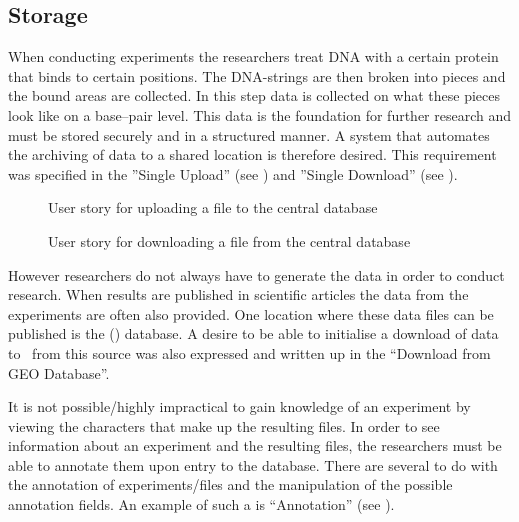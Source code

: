 \subsection{Storage}

When conducting experiments the researchers treat DNA with a certain protein that binds to certain positions. The DNA-strings are then broken into pieces and the bound areas are collected. In this step  data is collected on what these pieces look like on a base--pair level. This data is the foundation for further research and must be stored securely and in a structured manner. A system that automates the archiving of  data to a shared location is therefore desired. This requirement was specified in the  ''Single Upload'' (see ) and ''Single Download'' (see ).

\begin{figure}[h]
\caption{User story for uploading a file to the central database}
\label{fig:target_upload}
\end{figure}

\begin{figure}[h]
\caption{User story for downloading a file from the central database}
\label{fig:target_download}
\end{figure}

However researchers do not always have to generate the  data in order to conduct research. When results are published in scientific articles the  data from the experiments are often also provided. One location where these  data files can be published is the  () database. A desire to be able to initialise a download of  data to \appName\ from this source was also expressed and written up in the  ``Download from GEO Database''.

It is not possible/highly impractical to gain knowledge of an experiment by viewing the characters that make up the resulting  files. In order to see information about an experiment and the resulting files, the researchers must be able to annotate them upon entry to the database. There are several  to do with the annotation of experiments/files and the manipulation of the possible annotation fields. An example of such a  is ``Annotation'' (see ).

